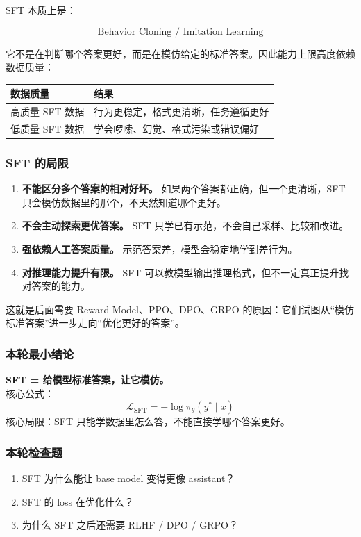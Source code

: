SFT 本质上是：

\[
\text{Behavior Cloning / Imitation Learning}
\]

它不是在判断哪个答案更好，而是在模仿给定的标准答案。因此能力上限高度依赖数据质量：

\begin{center}
{\small
\begin{tabular}{p{4cm}p{8.5cm}}
\hline
\textbf{数据质量} & \textbf{结果} \\
\hline
高质量 SFT 数据 & 行为更稳定，格式更清晰，任务遵循更好 \\
低质量 SFT 数据 & 学会啰嗦、幻觉、格式污染或错误偏好 \\
\hline
\end{tabular}
}
\end{center}

\subsubsection{SFT 的局限}

\begin{enumerate}[leftmargin=1.5em]
  \item \textbf{不能区分多个答案的相对好坏。} 如果两个答案都正确，但一个更清晰，SFT 只会模仿数据里的那个，不天然知道哪个更好。
  \item \textbf{不会主动探索更优答案。} SFT 只学已有示范，不会自己采样、比较和改进。
  \item \textbf{强依赖人工答案质量。} 示范答案差，模型会稳定地学到差行为。
  \item \textbf{对推理能力提升有限。} SFT 可以教模型输出推理格式，但不一定真正提升找对答案的能力。
\end{enumerate}

这就是后面需要 Reward Model、PPO、DPO、GRPO 的原因：它们试图从“模仿标准答案”进一步走向“优化更好的答案”。

\subsubsection{本轮最小结论}

\begin{summarybox}
\textbf{SFT = 给模型标准答案，让它模仿。}\\
核心公式：
\[
\mathcal{L}_\text{SFT} = - \log \pi_\theta(y^\ast \mid x)
\]
核心局限：SFT 只能学数据里怎么答，不能直接学哪个答案更好。
\end{summarybox}

\subsubsection{本轮检查题}

\begin{enumerate}[leftmargin=1.5em]
  \item SFT 为什么能让 base model 变得更像 assistant？
  \item SFT 的 loss 在优化什么？
  \item 为什么 SFT 之后还需要 RLHF / DPO / GRPO？
\end{enumerate}
